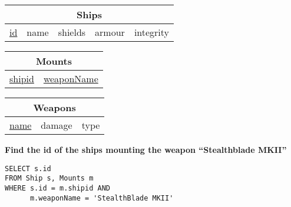 \documentclass{beamer}
\begin{document}
\begin{frame}[fragile]

\begin{tabular}{|c|c|c|c|c|}
\hline
\multicolumn{5}{|c|}{\textbf{Ships}} \\
\hline
\underline{id} & name & shields & armour & integrity \\
\hline
\end{tabular}

\begin{tabular}{|c|c|}
\hline
\multicolumn{2}{|c|}{\textbf{Mounts}} \\
\hline
\underline{shipid} & \underline{weaponName} \\
\hline
\end{tabular}

\begin{tabular}{|c|c|c|}
\hline
\multicolumn{3}{|c|}{\textbf{Weapons}} \\
\hline
\underline{name} & damage & type \\
\hline
\end{tabular}

\vspace{0.25cm}
\textbf{Find the id of the ships mounting the weapon ``Stealthblade MKII''}
\pause
\begin{lstlisting}[showstringspaces=false]
SELECT s.id
FROM Ship s, Mounts m
WHERE s.id = m.shipid AND 
      m.weaponName = 'StealthBlade MKII'
\end{lstlisting}

\end{frame}
\end{document}
